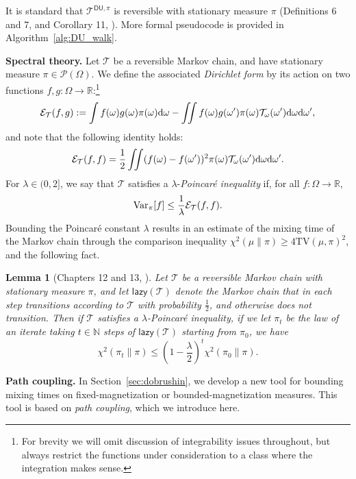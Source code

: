 \documentclass[11pt]{article}
\newtheorem{lemma}{Lemma}
\newcommand{\defeq}{:=}
\newcommand{\lam}{\lambda}
\newcommand{\R}{\mathbb{R}}
\newcommand{\N}{\mathbb{N}}
\newcommand{\half}{\frac{1}{2}}
\newcommand{\1}{\mathbf{1}}
\newcommand{\0}{\mathbf{0}}
\newcommand{\Var}{\textup{Var}}
\newcommand{\dd}{\textup{d}}
\newcommand{\Par}[1]{\left(#1\right)}
\newcommand{\TV}[1]{\mathrm{TV}\left(#1\right)}
\newcommand{\CS}[2]{\chi^2\left(#1\|#2\right)}
\newcommand{\lazy}{\mathsf{lazy}}
\newcommand{\calE}{{\mathcal{E}}}
\newcommand{\calP}{{\mathcal{P}}}
\newcommand{\calT}{{\mathcal{T}}}
\newcommand{\TDU}[1]{\calT^{\mathsf{DU}, #1}}
\begin{document}
It is standard that $\TDU{\pi}$ is reversible with stationary measure $\pi$ (Definitions 6 and 7, and Corollary 11, \cite{KaufmanO20}). More formal pseudocode is provided in Algorithm~\ref{alg:DU_walk}.

\textbf{Spectral theory.} Let $\calT$ be a reversible Markov chain, and have stationary measure $\pi \in \calP(\Omega)$. We define the associated \emph{Dirichlet form} by its action on two functions $f, g: \Omega \to \R$:\footnote{For brevity we will omit discussion of integrability issues throughout, but always restrict the functions under consideration to a class where the integration makes sense.}
\[\calE_{\calT}(f, g) \defeq \int f(\omega) g(\omega)\pi(\omega) \dd \omega - \iint f(\omega) g(\omega') \pi(\omega) \calT_\omega(\omega') \dd\omega \dd \omega', \]
and note that the following identity holds:
\begin{equation}\label{eq:variance_form_dir}\calE_{\calT}(f, f) = \half \iint (f(\omega) - f(\omega'))^2 \pi(\omega)\calT_{\omega}(\omega') \dd \omega \dd \omega'.\end{equation}
For $\lam \in (0, 2]$, we say that $\calT$ satisfies a $\lam$-\emph{Poincar\'e inequality} if, for all $f: \Omega \to \R$,
\[\Var_\pi[f] \le \frac 1 \lam \calE_{\calT}(f, f).\]
Bounding the Poincar\'e constant $\lam$ results in an estimate of the mixing time of the Markov chain through the comparison inequality $\CS{\mu}{\pi} \ge 4\TV{\mu, \pi}^2$, and the following fact.
\begin{lemma}[Chapters 12 and 13, \cite{LevinPW09}]\label{lem:variance_decay}
Let $\calT$ be a reversible Markov chain with stationary measure $\pi$, and let $\lazy(\calT)$ denote the Markov chain that in each step transitions according to $\calT$ with probability $\half$, and otherwise does not transition. Then if $\calT$ satisfies a $\lam$-Poincar\'e inequality, if we let $\pi_t$ be the law of an iterate taking $t \in \N$ steps of $\lazy(\calT)$ starting from $\pi_0$, we have
\[\chi^2(\pi_t \| \pi) \le \Par{1 - \frac \lam 2}^t \chi^2(\pi_0 \| \pi).\]
\end{lemma}

\textbf{Path coupling.} In Section~\ref{sec:dobrushin}, we develop a new tool for bounding mixing times on fixed-magnetization or bounded-magnetization measures. This tool is based on \emph{path coupling}, which we introduce here.
\end{document}

